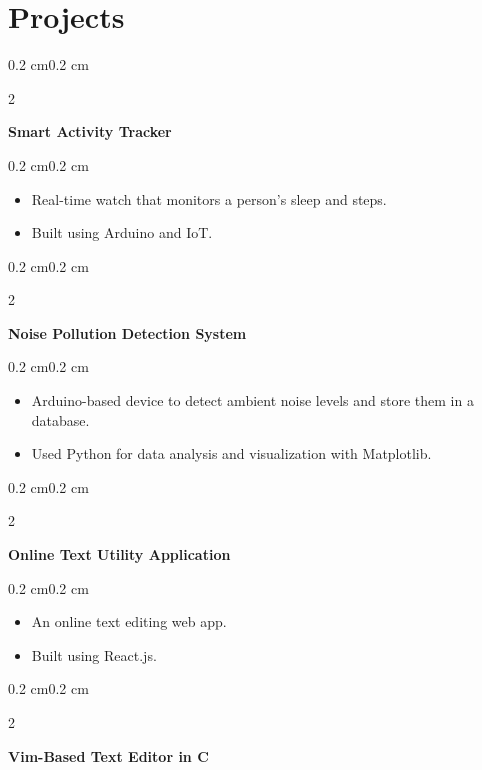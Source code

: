 \documentclass[10pt, letterpaper]{article}
\newenvironment{highlights}{
    \begin{itemize}[
        topsep=0.10 cm,
        parsep=0.10 cm,
        partopsep=0pt,
        itemsep=0pt,
        leftmargin=0.4 cm + 10pt
    ]
}{
    \end{itemize}
}
\newenvironment{onecolentry}{
    \begin{adjustwidth}{0.2 cm}{0.2 cm}
}{
    \end{adjustwidth}
}
\newenvironment{twocolentry}[2][]{
    \onecolentry
    \def\secondColumn{#2}
    \setcolumnwidth{\fill, 4.5 cm}
    \begin{paracol}{2}
}{
    \switchcolumn \raggedleft \secondColumn
    \end{paracol}
    \endonecolentry
}
\begin{document}
\section{Projects}

\begin{twocolentry}{
}
    \textbf{Smart Activity Tracker}
\end{twocolentry}

\vspace{0.10 cm}
\begin{onecolentry}
    \begin{highlights}
        \item Real-time watch that monitors a person's sleep and steps.
        \item Built using Arduino and IoT.
    \end{highlights}
\end{onecolentry}

\vspace{0.2 cm}
\begin{twocolentry}{
}
    \textbf{Noise Pollution Detection System}
\end{twocolentry}

\vspace{0.10 cm}
\begin{onecolentry}
    \begin{highlights}
        \item Arduino-based device to detect ambient noise levels and store them in a database.
        \item Used Python for data analysis and visualization with Matplotlib.
    \end{highlights}
\end{onecolentry}

\vspace{0.2 cm}
\begin{twocolentry}{
}
    \textbf{Online Text Utility Application}
\end{twocolentry}

\vspace{0.10 cm}
\begin{onecolentry}
    \begin{highlights}
        \item An online text editing web app.
        \item Built using React.js.
    \end{highlights}
\end{onecolentry}

\vspace{0.2 cm}
\begin{twocolentry}{
}
    \textbf{Vim-Based Text Editor in C}
\end{twocolentry}
\end{document}

